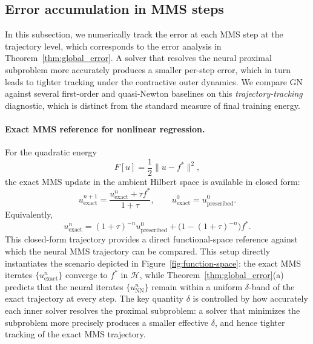 \documentclass[twoside,11pt]{article}
\begin{document}
\subsection{Error accumulation in MMS steps}

In this subsection, we numerically track the error at each MMS step at the trajectory level, which corresponds to the error analysis in Theorem~\ref{thm:global_error}. A solver that resolves the neural proximal subproblem more
accurately produces a smaller per-step error, which in turn leads to tighter tracking
under the contractive outer dynamics.  We compare GN against several first-order and
quasi-Newton baselines on this \emph{trajectory-tracking} diagnostic, which is distinct
from the standard measure of final training energy.


\paragraph{Exact MMS reference for nonlinear regression.}
For the quadratic energy
\[
    F[u] = \frac12 \|u-f^\ast\|^2,
\]
the exact MMS update in the ambient Hilbert space is available in closed form:
\begin{equation}
    u^{n+1}_{\mathrm{exact}}
    =
    \frac{u^n_{\mathrm{exact}}+\tau f^\ast}{1+\tau},
    \qquad
    u^0_{\mathrm{exact}}=u^0_{\mathrm{prescribed}} .
    \label{eq:mms-exact}
\end{equation}
Equivalently,
\begin{equation}
    u^n_{\mathrm{exact}}
    =
    (1+\tau)^{-n} u^0_{\mathrm{prescribed}}
    +
    \Big(1-(1+\tau)^{-n}\Big) f^\ast .
    \label{eq:mms-exact-closed}
\end{equation}
This closed-form trajectory provides a direct functional-space reference against which the neural MMS trajectory can be compared. This setup directly instantiates the scenario depicted in Figure~\ref{fig:function-space}: the exact MMS iterates $\{u^n_{\mathrm{exact}}\}$ converge to $f^*$ in $\mathcal{H}$, while Theorem~\ref{thm:global_error}(a) predicts that the neural iterates $\{u^n_{\mathrm{NN}}\}$ remain within a uniform $\delta$-band of the exact trajectory at every step.  The key quantity $\delta$ is controlled by how accurately each inner solver resolves the proximal subproblem: a solver that minimizes the subproblem more precisely produces a smaller effective $\delta$, and hence tighter tracking of the exact MMS trajectory.
\end{document}
